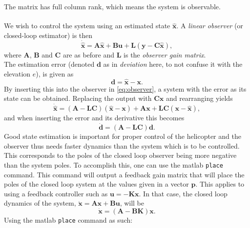 The matrix has full column rank, which means the system is observable.\\
\\
We wish to control the system using an estimated state $\mathbf{\hat{x}}$. A \textit{linear observer} (or closed-loop estimator) is then
\begin{equation}
    \label{eq:observer}
    \mathbf{\dot{\hat{x}}} = \mathbf{A\hat{x}} + \mathbf{Bu} + \mathbf{L} (\mathbf{y} - \mathbf{C\hat{x}}),
\end{equation}
where $\mathbf A$, $\mathbf B$ and $\mathbf C$ are as before and $\mathbf L$ is the \textit{observer gain matrix}. \\
The estimation error (denoted $\mathbf{d}$ as in \textit{deviation} here, to not confuse it with the elevation $e$), is given as 
\begin{equation}
    \mathbf{d} = \hat{\mathbf{x}} - \mathbf{x}. \label{eq:est_error}
\end{equation}
By inserting this into the observer in \eqref{eq:observer}, a system with the error as its state can be obtained. Replacing the output with $\mathbf{C}\mathbf{x}$ and rearranging yields
\begin{equation*}
   \mathbf{\dot{\hat{x}}} = (\mathbf{A} - \mathbf{LC})(\mathbf{\hat{x}} - \mathbf{x}) + \mathbf{Ax} + \mathbf{LC}(\mathbf{x} - \mathbf{\hat{x}}),
\end{equation*}
and when inserting the error and its derivative this becomes
\begin{equation}
    \mathbf{\dot{d}} = (\mathbf{A} - \mathbf{LC})\mathbf{d}. \label{eq:observer_error_sys}
\end{equation}
Good state estimation is important for proper control of the helicopter and the observer thus needs faster dynamics than the system which is to be controlled. This corresponds to the poles of the closed loop observer being more negative than the system poles. To accomplish this, one can use the matlab \texttt{place} command. This command will output a feedback gain matrix that will place the poles of the closed loop system at the values given in a vector $\mathbf{p}$.
This applies to using a feedback controller such as $\mathbf{u} = -\mathbf{Kx}$. In that case, the closed loop dynamics of the system, $\mathbf{\dot{x}} = \mathbf{Ax} + \mathbf{Bu}$, will be
\begin{equation*}
    \mathbf{\dot{x}} = (\mathbf{A} - \mathbf{BK})\mathbf{x}.
\end{equation*}
 Using the  matlab \texttt{place} command as such:
